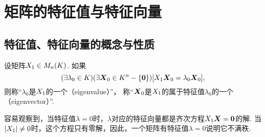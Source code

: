 \section{矩阵的特征值与特征向量}
\subsection{特征值、特征向量的概念与性质}
\begin{definition}
设矩阵\(X_1 \in M_n(K)\).
如果\[
	(\exists \lambda_0 \in K)
	(\exists \boldsymbol{X}_0 \in K^n - \{\boldsymbol0\})
	[X_1\boldsymbol{X}_0 = \lambda_0\boldsymbol{X}_0],
\]
则称“\(\lambda_0\)是\(X_1\)的一个（eigenvalue）”，
称“\(\boldsymbol{X}_0\)是\(X_1\)的属于特征值\(\lambda_0\)的一个（eigenvector）”.
\end{definition}

容易观察到，当特征值\(\lambda=0\)时，\(\lambda\)对应的特征向量都是齐次方程\(X_1\boldsymbol{X}=\boldsymbol{0}\)的解.
当\(\abs{X_1}\neq0\)时，这个方程只有零解，因此，一个矩阵有特征值\(\lambda=0\)说明它不满秩.


